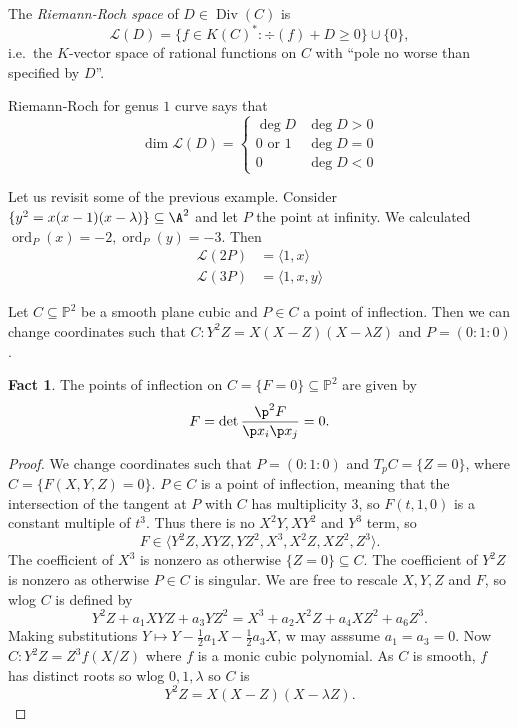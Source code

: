 \documentclass[a4paper]{article}
\theoremstyle{definition}
\newtheorem*{fact}{Fact}
\theoremstyle{theorem}
\renewcommand*{\P}{\mathbb{P}}
\DeclareMathOperator{\ord}{ord}
\DeclareMathOperator{\Div}{Div} %
\begin{document}
The \emph{Riemann-Roch space} of \(D \in \Div(C)\) is
\[
  \mathcal L(D) = \{f \in K(C)^*: \div(f) + D \geq 0\} \cup \{0\},
\]
i.e.\ the \(K\)-vector space of rational functions on \(C\) with ``pole no worse than specified by \(D\)''.

Riemann-Roch for genus \(1\) curve says that
\[
  \dim \mathcal L(D) =
  \begin{cases}
    \deg D & \deg D > 0 \\
    0 \text{ or } 1 & \deg D = 0 \\
    0 & \deg D < 0 
  \end{cases}
\]

\begin{eg}
  Let us revisit some of the previous example. Consider \(\{y^2 = x(x - 1)(x - \lambda)\} \subseteq \A^2\) and let \(P\) the point at infinity. We calculated \(\ord_P(x) = -2, \ord_P(y) = -3\). Then
  \begin{align*}
    \mathcal L(2P) &= \langle 1, x \rangle \\
    \mathcal L(3P) &= \langle 1, x, y \rangle
  \end{align*}
\end{eg}

\begin{proposition}
  Let \(C \subseteq \P^2\) be a smooth plane cubic and \(P \in C\) a point of inflection. Then we can change coordinates such that \(C: Y^2Z = X(X - Z)(X - \lambda Z)\) and \(P = (0: 1: 0)\).
\end{proposition}

\begin{fact}
  The points of inflection on \(C = \{F = 0\} \subseteq \P^2\) are given by
  \[
    F = \det \frac{\p^2 F}{\p x_i \p x_j} = 0.
  \]
\end{fact}

\begin{proof}
  We change coordinates such that \(P = (0 : 1 : 0)\) and \(T_pC = \{Z = 0\}\), where \(C = \{F(X, Y, Z) = 0\}\). \(P \in C\) is a point of inflection, meaning that the intersection of the tangent at \(P\) with \(C\) has multiplicity \(3\), so \(F(t, 1, 0)\) is a constant multiple of \(t^3\). Thus there is no \(X^2Y, XY^2\) and \(Y^3\) term, so
  \[
    F \in \langle Y^2Z, XYZ, YZ^2, X^3, X^2Z, XZ^2, Z^3 \rangle.
  \]
  The coefficient of \(X^3\) is nonzero as otherwise \(\{Z = 0\} \subseteq C\). The coefficient of \(Y^2Z\) is nonzero as otherwise \(P \in C\) is singular. We are free to rescale \(X, Y, Z\) and \(F\), so wlog \(C\) is defined by
  \[
    Y^2Z + a_1 XYZ + a_3 YZ^2 = X^3 + a_2 X^2Z + a_4 XZ^2 + a_6 Z^3.
  \]
  Making substitutions \(Y \mapsto Y - \frac{1}{2} a_1X - \frac{1}{2} a_3 X\), w may asssume \(a_1 = a_3 = 0\). Now \(C: Y^2Z = Z^3 f(X/Z)\) where \(f\) is a monic cubic polynomial. As \(C\) is smooth, \(f\) has distinct roots so wlog \(0, 1, \lambda\) so \(C\) is
  \[
    Y^2Z = X(X - Z)(X - \lambda Z).
  \]
\end{proof}
\end{document}
